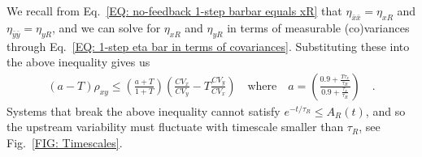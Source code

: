 \documentclass[%
 reprint,
superscriptaddress,
%
%
%
%
%
%
%
%
%
 amsmath,amssymb,
 aps,
%
%
%
%
%
%
onecolumn]{revtex4-2}
\begin{document}
We recall from Eq.~\eqref{EQ: no-feedback 1-step barbar equals xR} that $\eta_{\bar{x}\bar{x}} = \eta_{xR}$ and $\eta_{\bar{y}\bar{y}} = \eta_{yR}$, and we can solve 
for $\eta_{xR}$ and $\eta_{yR}$ in terms of measurable (co)variances through Eq.~\eqref{EQ: 1-step eta bar in terms of covariances}. Substituting these into the above inequality 
gives us
\begin{align}
 (a - T)\rho_{xy} \leq \left( \frac{a + T}{1+T} \right) \left( \frac{CV_{x}}{CV_{y}} - T\frac{CV_{y}}{CV_{x}}\right) \quad \text{where} \quad  a = \left(\frac{0.9 + \frac{T\tau_{x}}{\tau_{R}}}{0.9 + \frac{\tau_{x}}{\tau_{R}}}\right) \quad .
 \label{EQ: stricter bound}
\end{align}
Systems that break the above inequality cannot satisfy $e^{-t/\tau_{R}} \leq A_{R}(t)$, and so the upstream variability must 
fluctuate with timescale smaller than $\tau_{R}$, see Fig.~\ref{FIG: Timescales}. 
\end{document}
